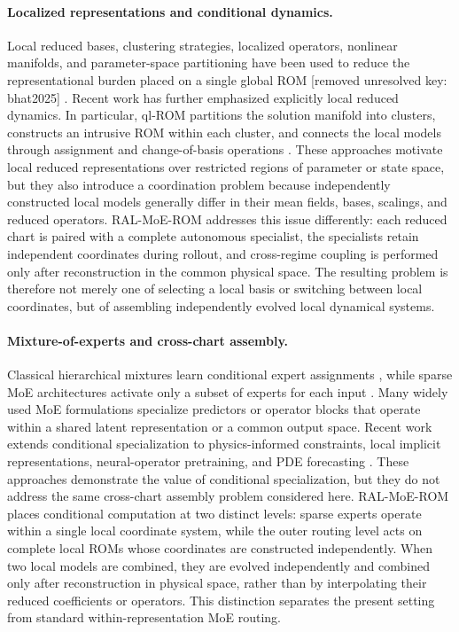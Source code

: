 \documentclass{article}
\providecommand{\DIFaddtex}[1]{{\protect\color{blue} \sf #1}} %
\providecommand{\DIFdeltex}[1]{{\protect\color{red} \scriptsize #1}} %
\providecommand{\DIFaddbegin}{} %
\providecommand{\DIFaddend}{} %
\providecommand{\DIFdelbegin}{} %
\providecommand{\DIFdelend}{} %
\providecommand{\DIFadd}[1]{\texorpdfstring{\DIFaddtex{#1}}{#1}} %
\providecommand{\DIFdel}[1]{\texorpdfstring{\DIFdeltex{#1}}{}} %
\providecommand{\DIFscaledelfig}{0.5}
\newlength{\DIFdelgraphicswidth} %
\newlength{\DIFdelgraphicsheight} %
\providecommand{\DIFaddincludegraphics}[2][]{{\color{blue}\fbox{\DIFOincludegraphics[#1]{#2}}}} %
\providecommand{\DIFdelincludegraphics}[2][]{%
\sbox{\DIFdelgraphicsbox}{\DIFOincludegraphics[#1]{#2}}%
\settoboxwidth{\DIFdelgraphicswidth}{\DIFdelgraphicsbox} %
\settoboxtotalheight{\DIFdelgraphicsheight}{\DIFdelgraphicsbox} %
\scalebox{\DIFscaledelfig}{%
\parbox[b]{\DIFdelgraphicswidth}{\usebox{\DIFdelgraphicsbox}\\[-\baselineskip] \rule{\DIFdelgraphicswidth}{0em}}\llap{\resizebox{\DIFdelgraphicswidth}{\DIFdelgraphicsheight}{%
\setlength{\unitlength}{\DIFdelgraphicswidth}%
\begin{picture}(1,1)%
\thicklines\linethickness{2pt} %
{\color[rgb]{1,0,0}\put(0,0){\framebox(1,1){}}}%
{\color[rgb]{1,0,0}\put(0,0){\line( 1,1){1}}}%
{\color[rgb]{1,0,0}\put(0,1){\line(1,-1){1}}}%
\end{picture}%
}\hspace*{3pt}}} %
} %
\DeclareRobustCommand{\DIFaddbegin}{\DIFOaddbegin \let\includegraphics\DIFaddincludegraphics} %
\DeclareRobustCommand{\DIFaddend}{\DIFOaddend \let\includegraphics\DIFOincludegraphics} %
\DeclareRobustCommand{\DIFdelbegin}{\DIFOdelbegin \let\includegraphics\DIFdelincludegraphics} %
\DeclareRobustCommand{\DIFdelend}{\DIFOaddend \let\includegraphics\DIFOincludegraphics} %
\begin{document}
\paragraph{Localized representations and conditional dynamics.}
Local reduced bases, clustering strategies, localized operators, nonlinear manifolds, and parameter-space partitioning have been used to reduce the representational burden placed on a single global ROM \DIFdelbegin \DIFdel{\citep{amsallem2008,peherstorfer2014,kaiser2014,li2021cluster,diaz2024} [removed unresolved key: bhat2025]}\DIFdelend \DIFaddbegin \DIFadd{\citep{amsallem2008,peherstorfer2014,kaiser2014,li2021cluster,diaz2024}}\DIFaddend . Recent work has further emphasized explicitly local reduced dynamics. In particular, ql-ROM partitions the solution manifold into clusters, constructs an intrusive ROM within each cluster, and connects the local models through assignment and change-of-basis operations
\citep{colanera2025}. These approaches motivate local reduced representations over restricted regions of parameter or state space, but they also introduce a coordination problem because independently constructed local models generally differ in
their mean fields, bases, scalings, and reduced operators. RAL-MoE-ROM addresses this issue differently: each reduced chart is paired with a complete autonomous specialist, the specialists retain independent coordinates during rollout, and cross-regime coupling is performed only after reconstruction in the common physical space. The resulting problem is therefore not merely one of selecting a local basis or switching between local coordinates, but of assembling independently evolved local dynamical systems.






\paragraph{Mixture-of-experts and cross-chart assembly.}
Classical hierarchical mixtures learn conditional expert assignments \citep{jacobs1991,jordan1994}, while sparse MoE architectures activate only a subset of experts for each input \citep{shazeer2017,fedus2022}. Many widely used MoE formulations specialize predictors or operator blocks that operate within a shared latent representation or a common output space. Recent work extends conditional specialization to physics-informed constraints, local implicit representations, neural-operator pretraining, and PDE forecasting \citep{ICLR2024_9aeda582,NEURIPS2024_b83fae17,NEURIPS2025_2d23a999,ICLR2026_754612bd}. These approaches demonstrate the value of conditional specialization, but they do not address the same cross-chart assembly problem considered here. RAL-MoE-ROM places conditional computation at two distinct levels: sparse experts operate within a single local coordinate system, while the outer routing level acts on complete local ROMs whose coordinates are constructed independently. When two local models are combined, they are evolved independently and
combined only after reconstruction in physical space, rather than by interpolating their reduced coefficients or operators. This distinction separates the present setting from standard within-representation MoE routing.
\end{document}

